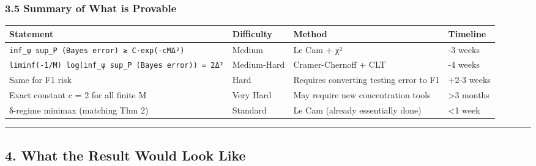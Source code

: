 \documentclass[
  12pt,
]{ctexart}
\begin{document}
\subsubsection{3.5 Summary of What is
Provable}\label{summary-of-what-is-provable}

\begin{longtable}[]{@{}
  >{\raggedright\arraybackslash}p{}
  >{\raggedright\arraybackslash}p{}
  >{\raggedright\arraybackslash}p{}
  >{\raggedright\arraybackslash}p{}@{}}
\toprule\noalign{}
\begin{minipage}[b]{\linewidth}\raggedright
Statement
\end{minipage} & \begin{minipage}[b]{\linewidth}\raggedright
Difficulty
\end{minipage} & \begin{minipage}[b]{\linewidth}\raggedright
Method
\end{minipage} & \begin{minipage}[b]{\linewidth}\raggedright
Timeline
\end{minipage} \\
\midrule\noalign{}
\endhead
\bottomrule\noalign{}
\endlastfoot
\texttt{inf\_ψ\ sup\_P\ (Bayes\ error)\ ≥\ C·exp(-cMΔ²)} & Medium & Le
Cam + χ² & 2-3 weeks \\
\texttt{liminf(-1/M)\ log(inf\_ψ\ sup\_P\ (Bayes\ error))\ =\ 2Δ²} &
Medium-Hard & Cramer-Chernoff + CLT & 3-4 weeks \\
Same for F1 risk & Hard & Requires converting testing error to F1 & +2-3
weeks \\
Exact constant c = 2 for all finite M & Very Hard & May require new
concentration tools & \textgreater3 months \\
δ-regime minimax (matching Thm 2) & Standard & Le Cam (already
essentially done) & \textless1 week \\
\end{longtable}

\begin{center}\rule{0.5\linewidth}{0.5pt}\end{center}

\subsection{4. What the Result Would Look
Like}\label{what-the-result-would-look-like}
\end{document}
